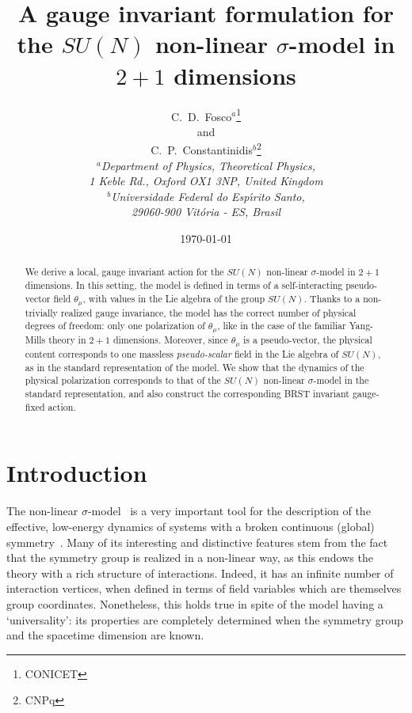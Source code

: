 \documentclass[a4paper,12pt]{article}
\begin{document}
\title{A gauge invariant formulation for the $SU(N)$ non-linear
  $\sigma$-model in $2+1$ dimensions}
\author{C.\ D.\ Fosco$^a$\thanks{CONICET}\\
  and\\
  C.\ P.\ Constantinidis$^b$\thanks{CNPq}\\
  {\normalsize\it $^a$Department of Physics, Theoretical Physics,}\\
  {\normalsize\it 1 Keble Rd., Oxford OX1 3NP, United Kingdom}\\
  {\normalsize\it $^b$Universidade Federal do Esp\'{\i}rito Santo,}\\
  {\normalsize\it 29060-900 Vit\'oria - ES, Brasil}} \date{\today}
\maketitle
\begin{abstract}
\noindent
We derive a local, gauge invariant action for the $SU(N)$ non-linear
$\sigma$-model in $2+1$ dimensions. In this setting, the model is
defined in terms of a self-interacting pseudo-vector field
$\theta_\mu$, with values in the Lie algebra of the group $SU(N)$.
Thanks to a non-trivially realized gauge invariance, the model has the
correct number of physical degrees of freedom: only one polarization
of $\theta_\mu$, like in the case of the familiar Yang-Mills theory in
$2+1$ dimensions.  Moreover, since $\theta_\mu$ is a pseudo-vector,
the physical content corresponds to one massless {\em pseudo-scalar\/}
field in the Lie algebra of $SU(N)$, as in the standard representation
of the model.  We show that the dynamics of the physical polarization
corresponds to that of the $SU(N)$ non-linear $\sigma$-model in the
standard representation, and also construct the corresponding BRST
invariant gauge-fixed action.
\end{abstract}
\bigskip
\section{Introduction}\label{sec:intro}
The non-linear $\sigma$-model~\cite{weinberg1} is a very important
tool for the description of the effective, low-energy dynamics of
systems with a broken continuous (global) symmetry~\cite{zinn}. Many
of its interesting and distinctive features stem from the fact that
the symmetry group is realized in a non-linear way, as this endows the
theory with a rich structure of interactions. Indeed, it has an
infinite number of interaction vertices, when defined in terms of
field variables which are themselves group coordinates.  Nonetheless,
this holds true in spite of the model having a `universality': its
properties are completely determined when the symmetry group and the
spacetime dimension are known.
\end{document}
